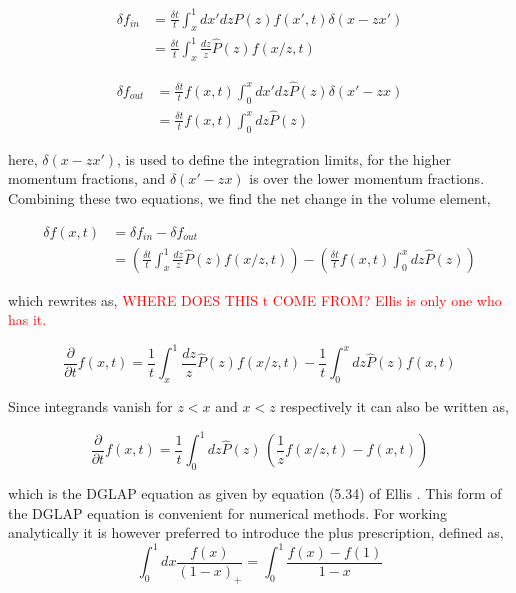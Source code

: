 \documentclass[main.tex]{subfiles}
\begin{document}
\begin{align}
    \delta f_{in} &= \frac{\delta t}{t} \int_x^1 dx' dz \hat{P}(z) f(x',t) \delta (x-zx') \nonumber\\
    &= \frac{\delta t}{t} \int_x^1 \frac{dz}{z} \hat{P}(z) f(x/z,t)
\end{align}

\begin{align}
    \delta f_{out} &= \frac{\delta t}{t} f(x,t) \int_0^x dx' dz \hat{P}(z) \delta (x'-zx) \nonumber \\
    &= \frac{\delta t}{t} f(x,t) \int_0^x dz\hat{P}(z) 
\end{align}

here, \(\delta(x-zx')\), is used to define the integration limits, for the higher momentum fractions, and \(\delta(x'-zx)\) is over the lower momentum fractions. 
Combining these two equations, we find the net change in the volume element, 

\begin{align} %
    \delta f(x,t) &= \delta f_{in} - \delta f_{out} \nonumber \\
    &= \left( \frac{\delta t}{t} \int_x^1 \frac{dz}{z} \hat{P}(z) f(x/z,t) \right) - \left( \frac{\delta t}{t} f(x,t) \int_0^x dz \hat{P}(z) \right)
\end{align}

which rewrites as, \textcolor{red}{WHERE DOES THIS t COME FROM? Ellis is only one who has it.}

\begin{equation}\label{eqn: DGLAP_ellisblaizot_with_limits}
    \frac{\partial}{\partial t} f(x,t) =\frac{1}{t} \int_x^1 \frac{dz}{z} \hat{P}(z) f(x/z,t) - \frac{1}{t} \int_0^x dz \hat{P}(z) f(x,t) 
\end{equation}
    

Since integrands vanish for \(z<x\) and \(x<z\) respectively it can also be written as, 

\begin{equation}\label{eqn: DGLAP_ellisblaizot}
    \frac{\partial}{\partial t} f(x,t) = \frac{1}{t} \int_0^1 dz \hat{P}(z) \, \left( \frac{1}{z} f(x/z,t) - f(x,t) \right)
\end{equation}

which is the DGLAP equation as given by equation (5.34) of Ellis \cite{ellis_stirling_webber_1996}. This form of the DGLAP equation is convenient for numerical methods. For working analytically it is however preferred to introduce the plus prescription, defined as,
\begin{equation}\label{eqn: ellis_plusprescription}
    \int_0^1 dx \frac{f(x)}{(1-x)_+} = \int_0^1 \frac{f(x)-f(1)}{1-x}
\end{equation}
\end{document}
